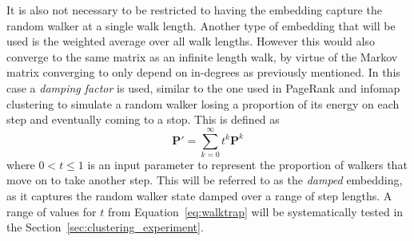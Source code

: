 It is also not necessary to be restricted to having the embedding capture the random walker at a single walk length. Another type of embedding that will be used is the weighted average over all walk lengths. However this would also converge to the same matrix as an infinite length walk, by virtue of the Markov matrix converging to only depend on in-degrees as previously mentioned. In this case a \emph{damping factor} is used, similar to the one used in PageRank \citep{Page1999} and infomap clustering \citep{Rosvall2008} to simulate a random walker losing a proportion of its energy on each step and eventually coming to a stop. This is defined as
\begin{equation}
  \mathbf{P}' = \sum_{k=0}^\infty t^k\mathbf{P}^{k}
  \label{eq:damped}
\end{equation}
where $0<t\leq 1$ is an input parameter to represent the proportion of walkers that move on to take another step. This will be referred to as the \emph{damped} embedding, as it captures the random walker state damped over a range of step lengths. A range of values for $t$ from Equation~\eqref{eq:walktrap} will be systematically tested in the Section~\ref{sec:clustering_experiment}.


